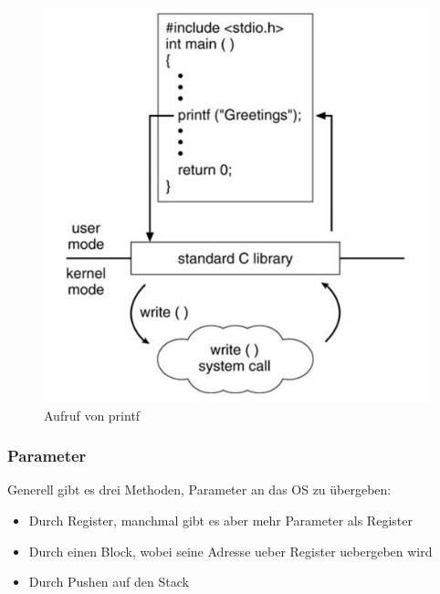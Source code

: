 \documentclass[a4paper]{scrreprt}
\begin{document}
\begin{figure}[ht]
\centering
\includegraphics[scale=0.4]{graphics/printf.png}
\caption{Aufruf von printf}
\end{figure}

\subsubsection{Parameter}
Generell gibt es drei Methoden, Parameter an das OS zu übergeben:
\begin{itemize}
	\item Durch Register, manchmal gibt es aber mehr Parameter als Register
	\item Durch einen Block, wobei seine Adresse ueber Register uebergeben wird
	\item Durch Pushen auf den Stack
\end{itemize}
\end{document}
